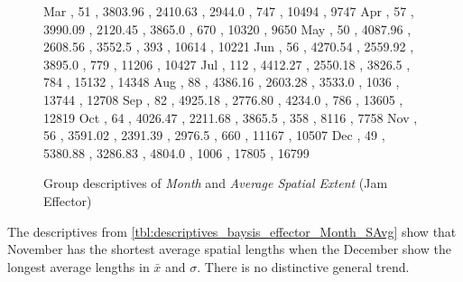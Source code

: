 \begin{figure}[ht!]
\begin{minipage}{0.55\textwidth}
{			Mar , 51  , 3803.96 , 2410.63 , 2944.0 , 747  , 10494 , 9747  
			Apr , 57  , 3990.09 , 2120.45 , 3865.0 , 670  , 10320 , 9650  
			May , 50  , 4087.96 , 2608.56 , 3552.5 , 393  , 10614 , 10221 
			Jun , 56  , 4270.54 , 2559.92 , 3895.0 , 779  , 11206 , 10427 
			Jul , 112 , 4412.27 , 2550.18 , 3826.5 , 784  , 15132 , 14348 
			Aug , 88  , 4386.16 , 2603.28 , 3533.0 , 1036 , 13744 , 12708 
			Sep , 82  , 4925.18 , 2776.80 , 4234.0 , 786  , 13605 , 12819 
			Oct , 64  , 4026.47 , 2211.68 , 3865.5 , 358  , 8116  , 7758  
			Nov , 56  , 3591.02 , 2391.39 , 2976.5 , 660  , 11167 , 10507 
			Dec , 49  , 5380.88 , 3286.83 , 4804.0 , 1006 , 17805 , 16799 
		}\data
		\pgfplotstablesort[sort key=mean, sort cmp=float >]{\datasorted}{\data}
		\tiny
		\centering
		\label{fig:descriptives_baysis_effector_Month_SAvg}
	\end{minipage}%
	\caption{Group descriptives of \textit{Month} and \textit{Average Spatial Extent} (Jam Effector)}
\end{figure}
The descriptives from \cref{tbl:descriptives_baysis_effector_Month_SAvg} show that November has the shortest average spatial lengths when the December show the longest average lengths in $\bar{x}$ and $\sigma$. There is no distinctive general trend.